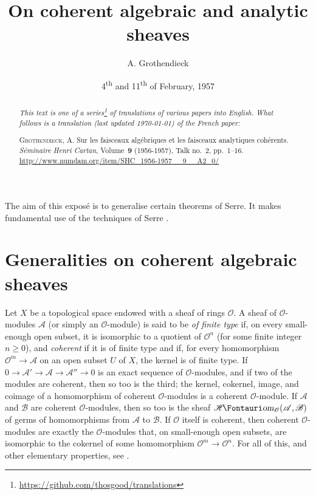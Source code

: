 \documentclass{article}
\theoremstyle{plain}
\theoremstyle{definition}
\newcommand{\sh}{\mathscr}
\newcommand{\shHom}{\sh{H}\textup{\kern-2.2pt{\Fontauri\slshape om}}}
\renewcommand{\geq}{\geqslant}
\newcommand{\oldpage}[1]{\marginpar{\footnotesize$\Big\vert$ \textit{p.~#1}}}
\begin{document}
\renewcommand{\abstractname}{Translator's note.}

\title{On coherent algebraic and analytic sheaves}
\author{A. Grothendieck}
\date{4\textsuperscript{th} and 11\textsuperscript{th} of February, 1957}
\maketitle

\begin{abstract}
  \renewcommand*{\thefootnote}{\fnsymbol{footnote}}
  \emph{This text is one of a series\footnote{\url{https://github.com/thosgood/translations}} of translations of various papers into English.}
  \emph{What follows is a translation (last updated \today) of the French paper:}

  \medskip\noindent
  \textsc{Grothendieck, A}. Sur les faisceaux algébriques et les faisceaux analytiques cohérents. \emph{Séminaire Henri Cartan}, Volume~\textbf{9} (1956-1957), Talk no.~2, pp.~1–16. {\footnotesize\url{http://www.numdam.org/item/SHC_1956-1957__9__A2_0/}}
\end{abstract}

\tableofcontents



\bigskip\bigskip
The aim of this exposé is to generalise certain theorems of Serre.
\oldpage{2-01}
It makes fundamental use of the techniques of Serre \cite{1,2,3}.


\section{Generalities on coherent algebraic sheaves}
\label{section1}

Let $X$ be a topological space endowed with a sheaf of rings $\sh{O}$.
A sheaf of $\sh{O}$-modules $\sh{A}$ (or simply an $\sh{O}$-module) is said to be \emph{of finite type} if, on every small-enough open subset, it is isomorphic to a quotient of $\sh{O}^n$ (for some finite integer $n\geq0$), and \emph{coherent} if it is of finite type and if, for every homomorphism $\sh{O}^m\to\sh{A}$ on an open subset $U$ of $X$, the kernel is of finite type.
If $0\to\sh{A}'\to\sh{A}\to\sh{A}''\to0$ is an exact sequence of $\sh{O}$-modules, and if two of the modules are coherent, then so too is the third;
the kernel, cokernel, image, and coimage of a homomorphism of coherent $\sh{O}$-modules is a coherent $\sh{O}$-module.
If $\sh{A}$ and $\sh{B}$ are coherent $\sh{O}$-modules, then so too is the sheaf $\shHom_\sh{O}(\sh{A},\sh{B})$ of germs of homomorphisms from $\sh{A}$ to $\sh{B}$.
If $\sh{O}$ itself is coherent, then coherent $\sh{O}$-modules are exactly the $\sh{O}$-modules that, on small-enough open subsets, are isomorphic to the cokernel of some homomorphism $\sh{O}^m\to\sh{O}^n$.
For all of this, and other elementary properties, see \cite[chapitre~1, paragraphe~2]{1}.
\end{document}
